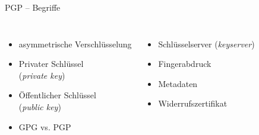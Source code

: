 \documentclass{beamer}
\begin{document}

\begin{frame}[label=begriffe]{PGP – Begriffe}
  
  \begin{columns}
  \begin{itemize}
   \item asymmetrische Verschlüsselung
   \item Privater Schlüssel\\(\textit{private key})
   \item Öffentlicher Schlüssel\\(\textit{public key})
   \item GPG vs. PGP
  \end{itemize}

  \pause

  \begin{itemize}
   \item Schlüsselserver (\textit{keyserver})
   \item Fingerabdruck
   \item Metadaten
   \item Widerrufszertifikat
  \end{itemize}
\end{columns}
\end{frame}

\end{document}
